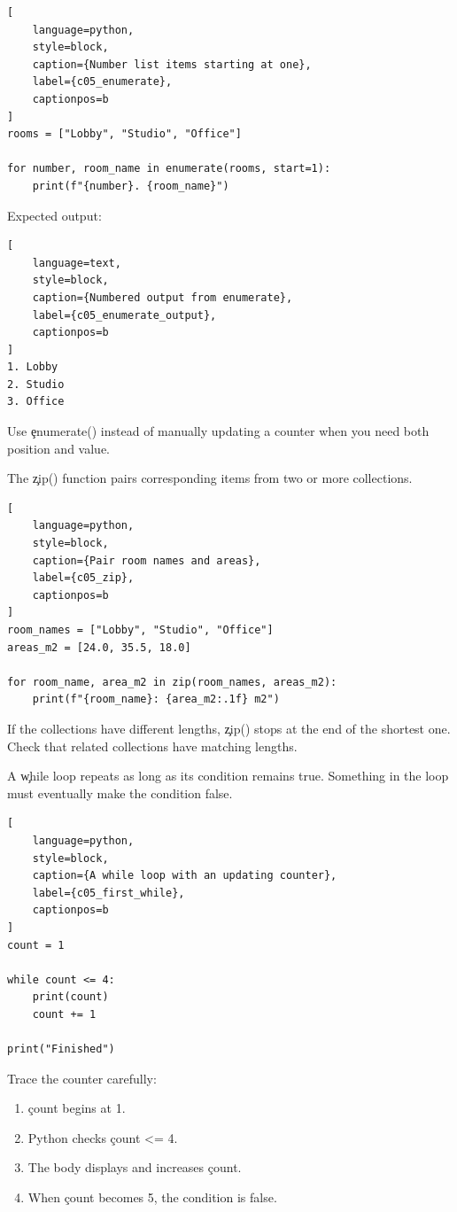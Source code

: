 \begin{lstlisting}[
    language=python,
    style=block,
    caption={Number list items starting at one},
    label={c05_enumerate},
    captionpos=b
]
rooms = ["Lobby", "Studio", "Office"]

for number, room_name in enumerate(rooms, start=1):
    print(f"{number}. {room_name}")
\end{lstlisting}

Expected output:

\begin{lstlisting}[
    language=text,
    style=block,
    caption={Numbered output from enumerate},
    label={c05_enumerate_output},
    captionpos=b
]
1. Lobby
2. Studio
3. Office
\end{lstlisting}

Use \c{enumerate()} instead of manually updating a counter when you need both
position and value.


The \c{zip()} function pairs corresponding items from two or more collections.

\begin{lstlisting}[
    language=python,
    style=block,
    caption={Pair room names and areas},
    label={c05_zip},
    captionpos=b
]
room_names = ["Lobby", "Studio", "Office"]
areas_m2 = [24.0, 35.5, 18.0]

for room_name, area_m2 in zip(room_names, areas_m2):
    print(f"{room_name}: {area_m2:.1f} m2")
\end{lstlisting}

If the collections have different lengths, \c{zip()} stops at the end of the
shortest one. Check that related collections have matching lengths.


A \c{while} loop repeats as long as its condition remains true. Something in
the loop must eventually make the condition false.

\begin{lstlisting}[
    language=python,
    style=block,
    caption={A while loop with an updating counter},
    label={c05_first_while},
    captionpos=b
]
count = 1

while count <= 4:
    print(count)
    count += 1

print("Finished")
\end{lstlisting}

Trace the counter carefully:
\begin{enumerate}
    \item \c{count} begins at 1.
    \item Python checks \c{count <= 4}.
    \item The body displays and increases \c{count}.
    \item When \c{count} becomes 5, the condition is false.
\end{enumerate}


